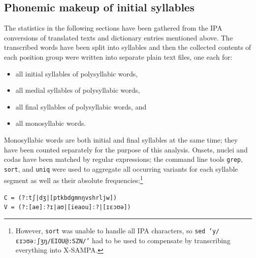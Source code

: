 \subsection{Phonemic makeup of initial syllables}

%
The statistics in the following sections have been gathered from the IPA 
conversions of translated texts and dictionary entries mentioned above. The 
transcribed words have been split into syllables and then the collected 
contents 
of each position group were written into separate plain text files, one each 
for:

\begin{itemize}
	\item all initial syllables of polysyllabic words,
	\item all medial syllables of polysyllabic words,
	\item all final syllables of polysyllabic words, and 
	\item all monosyllabic words.
\end{itemize}

Monosyllabic words are both initial and final syllables at the same time; they 
have been counted separately for the purpose of this analysis. Onsets, nuclei 
and codas have been matched by regular expressions; the com\-mand line tools 
\texttt{grep}, \texttt{sort}, and \texttt{uniq} were used to aggregate all 
occurring variants for each syllable segment as well as their absolute 
frequencies:\footnote{However, \texttt{sort} was unable to handle all IPA 
characters, so \texttt{sed 'y/ɛɪɔʊəːʃʒŋ/EIOU@:SZN/'} had to be used to 
compensate by transcribing everything into X-SAMPA.}

\ex
	\texttt{C = (?:tʃ|dʒ|[ptkbdgmnŋvshrljw])\\
	V = (?:[ae]ː?ɪ|aʊ|[ieaou]ː?|[ɪɛɔʊə])}
\xe

